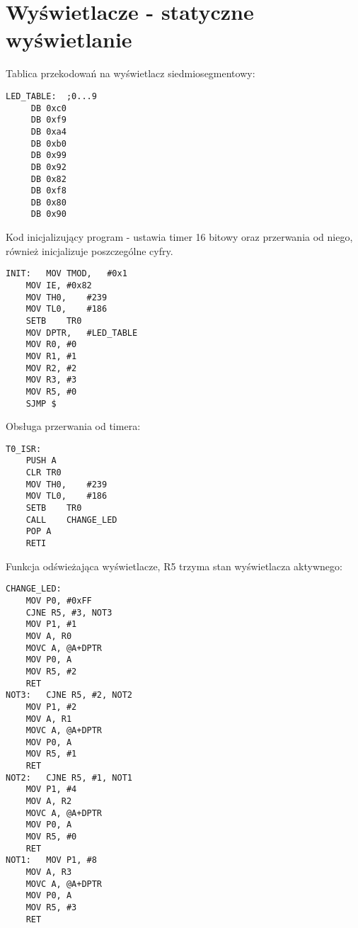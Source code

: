 \documentclass[a4paper, 12pt, titlepage]{article}
\begin{document}
	\section{Wyświetlacze - statyczne wyświetlanie}
	Tablica przekodowań na wyświetlacz siedmiosegmentowy:
\begin{lstlisting}
LED_TABLE:	;0...9
     DB 0xc0 
     DB 0xf9
     DB 0xa4
     DB 0xb0
     DB 0x99
     DB 0x92      
     DB 0x82
     DB 0xf8      
     DB 0x80      
     DB 0x90
\end{lstlisting}
	Kod inicjalizujący program - ustawia timer 16 bitowy oraz przerwania od niego, również inicjalizuje poszczególne cyfry.
\begin{lstlisting}
INIT:	MOV	TMOD,	#0x1
	MOV	IE,	#0x82
	MOV	TH0,	#239
	MOV	TL0,	#186
	SETB	TR0
	MOV	DPTR,	#LED_TABLE
	MOV	R0,	#0
	MOV	R1,	#1
	MOV	R2,	#2
	MOV	R3,	#3
	MOV R5, #0
	SJMP $
\end{lstlisting}
	Obsługa przerwania od timera:
\begin{lstlisting}
T0_ISR:    
	PUSH A
	CLR	TR0
	MOV	TH0,    #239
	MOV	TL0,    #186
	SETB	TR0
	CALL	CHANGE_LED
	POP A
	RETI
\end{lstlisting}
\newpage\noindent
Funkcja odświeżająca wyświetlacze, R5 trzyma stan wyświetlacza aktywnego:
\begin{lstlisting}
CHANGE_LED:
	MOV P0, #0xFF 
	CJNE R5, #3, NOT3
	MOV P1, #1
	MOV A, R0
	MOVC A, @A+DPTR
	MOV	P0, A
	MOV R5, #2
	RET
NOT3:	CJNE R5, #2, NOT2
	MOV P1, #2
	MOV A, R1
	MOVC A, @A+DPTR
	MOV	P0, A
	MOV R5, #1
	RET
NOT2:	CJNE R5, #1, NOT1
	MOV P1, #4
	MOV A, R2
	MOVC A, @A+DPTR
	MOV	P0, A
	MOV R5, #0
	RET
NOT1:	MOV P1, #8
	MOV A, R3
	MOVC A, @A+DPTR
	MOV	P0, A
	MOV R5, #3
	RET
\end{lstlisting}
\newpage\noindent
\end{document}
